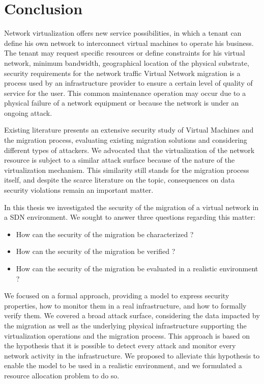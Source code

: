 \section{Conclusion}
\label{sec:thesis_conclusion}
Network virtualization offers new service possibilities, in which a tenant can define his own network to interconnect virtual machines to operate his business. The tenant may request specific resources or define constraints for his virtual network, \eg minimum bandwidth, geographical location of the physical substrate, security requirements for the network traffic \etc
Virtual Network migration is a process used by an infrastructure provider to ensure a certain level of quality of service for the user.
This common maintenance operation may occur due to a physical failure of a network equipment or because the network is under an ongoing attack.

Existing literature presents an extensive security study of Virtual Machines and the migration process, evaluating existing migration solutions and considering different types of attackers. We advocated that the virtualization of the network resource is subject to a similar attack surface because of the nature of the virtualization mechanism. This similarity still stands for the migration process itself, and despite the scarce literature on the topic, consequences on data security violations remain an important matter.

In this thesis we investigated the security of the migration of a virtual network in a SDN environment. 
We sought to answer three questions regarding this matter:

\begin{itemize}
    \item How can the security of the migration be characterized ?
    \item How can the security of the migration be verified ?
    \item How can the security of the migration be evaluated in a realistic environment ?
\end{itemize}

We focused on a formal approach, providing a model to express security properties, how to monitor them in a real infrastructure, and how to formally verify them. 
We covered a broad attack surface, considering the data impacted by the migration as well as the underlying physical infrastructure supporting the virtualization operations and the migration process. 
This approach is based on the hypothesis that it is possible to detect every attack and monitor every network activity in the infrastructure. 
We proposed to alleviate this hypothesis to enable the model to be used in a realistic environment, and we formulated a resource allocation problem to do so.

